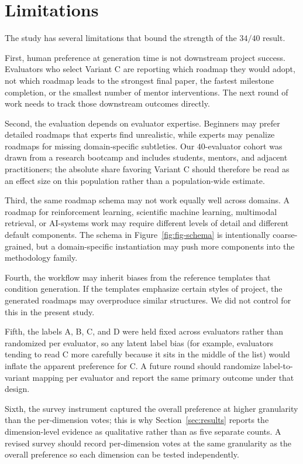 \documentclass{article}
\begin{document}
\section{Limitations}
\label{sec:limitations}

The study has several limitations that bound the strength of the
$34/40$ result.

First, human preference at generation time is not downstream project
success. Evaluators who select Variant C are reporting which roadmap
they would adopt, not which roadmap leads to the strongest final paper,
the fastest milestone completion, or the smallest number of mentor
interventions. The next round of work needs to track those downstream
outcomes directly.

Second, the evaluation depends on evaluator expertise. Beginners may
prefer detailed roadmaps that experts find unrealistic, while experts
may penalize roadmaps for missing domain-specific subtleties. Our
$40$-evaluator cohort was drawn from a research bootcamp and includes
students, mentors, and adjacent practitioners; the absolute share
favoring Variant C should therefore be read as an effect size on this
population rather than a population-wide estimate.

Third, the same roadmap schema may not work equally well across
domains. A roadmap for reinforcement learning, scientific machine
learning, multimodal retrieval, or AI-systems work may require
different levels of detail and different default components. The schema
in Figure~\ref{fig:fig-schema} is intentionally coarse-grained, but a
domain-specific instantiation may push more components into the
methodology family.

Fourth, the workflow may inherit biases from the reference templates
that condition generation. If the templates emphasize certain styles
of project, the generated roadmaps may overproduce similar structures.
We did not control for this in the present study.

Fifth, the labels A, B, C, and D were held fixed across evaluators
rather than randomized per evaluator, so any latent label bias (for
example, evaluators tending to read C more carefully because it sits
in the middle of the list) would inflate the apparent preference for
C. A future round should randomize label-to-variant mapping
per evaluator and report the same primary outcome under that design.

Sixth, the survey instrument captured the overall preference at higher
granularity than the per-dimension votes; this is why
Section~\ref{sec:results} reports the dimension-level evidence as
qualitative rather than as five separate counts. A revised survey
should record per-dimension votes at the same granularity as the
overall preference so each dimension can be tested independently.
\end{document}
